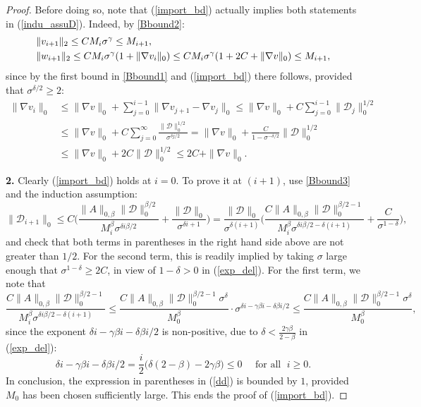 \documentclass[10pt,a4paper]{amsart}
\begin{document}
\begin{proof}
\smallskip

Before doing so, note that (\ref{import_bd}) actually implies both
statements in (\ref{indu_assuD}). Indeed, by \ref{Bbound2}:
\begin{equation*}
\begin{split}
& \|v_{i+1}\|_2\leq CM_i\sigma^\gamma\leq M_{i+1},\vspace{1mm}\\
& \|w_{i+1}\|_2\leq CM_i\sigma^\gamma(1+\|\nabla v_i\|_0) 
\leq CM_i\sigma^\gamma(1+2C +\|\nabla v\|_0) \leq M_{i+1},
\end{split}
\end{equation*}
since by the first bound in \ref{Bbound1} and (\ref{import_bd}) there
follows, provided that $\sigma^{\delta/2}\geq 2$:
\begin{equation}\label{pomoc_v}
\begin{split}
\|\nabla v_i\|_0 & \leq \|\nabla v\|_0 + \sum_{j=0}^{i-1}\|\nabla v_{j+1}-\nabla v_j\|_0
\leq \|\nabla v\|_0 + C\sum_{j=0}^{i-1}\|\mathcal{D}_j\|_0^{1/2} \\ & \leq 
\|\nabla v\|_0 + C\sum_{j=0}^{\infty}\frac{\|\mathcal{D}\|_0^{1/2}}{\sigma^{\delta j/2}} 
= \|\nabla v\|_0 + \frac{C}{1-\sigma^{-\delta/2}} \|\mathcal{D}\|_0^{1/2}
\\ & \leq \|\nabla v\|_0 + {2C} \|\mathcal{D}\|_0^{1/2} \leq 2C +\|\nabla v\|_0.
\end{split}
\end{equation}

\medskip

{\bf 2.} Clearly (\ref{import_bd}) holds at $i=0$. To prove
it at $(i+1)$, use \ref{Bbound3} and the induction assumption:
\begin{equation}\label{dd}
\|\mathcal{D}_{i+1}\|_0\leq C\Big( \frac{\|A\|_{0,\beta}
  \|\mathcal{D}\|_0^{\beta/2}}{M_i^\beta\sigma^{\delta i\beta/2}} +
\frac{\|\mathcal{D}\|_0}{\sigma^{\delta i +1}}\Big) = \frac{\|\mathcal{D}\|_{0}}{\sigma^{\delta(i+1)}}
\Big(\frac{C\|A\|_{0,\beta} \|\mathcal{D}\|_0^{\beta/2-1}}{M_i^\beta\sigma^{\delta i\beta/2 - \delta(i+1)}} +
\frac{C}{\sigma^{1-\delta}}\Big),
\end{equation}
and check that both terms in parentheses in the right hand side above
are not greater than $1/2$. For the second term, this is readily implied by
taking $\sigma$ large enough that $\sigma^{1-\delta}\geq 2C$, in view
of $1-\delta>0$ in (\ref{exp_del}). For the first term, we note that
$$\frac{C\|A\|_{0,\beta} \|\mathcal{D}\|_0^{\beta/2-1}}{M_i^\beta\sigma^{\delta i\beta/2 -  \delta(i+1)}} 
\leq \frac{C\|A\|_{0,\beta} \|\mathcal{D}\|_0^{\beta/2-1}\sigma^\delta}{M_0^\beta}
\cdot \sigma^{\delta i-\gamma\beta i - \delta\beta i/2} \leq \frac{C\|A\|_{0,\beta}
    \|\mathcal{D}\|_0^{\beta/2-1}\sigma^\delta}{M_0^\beta},$$  
since the exponent $\delta i-\gamma\beta i - \delta\beta i/2$ is
non-positive, due to $\delta < \frac{2\gamma\beta}{2-\beta}$ in (\ref{exp_del}):
$$\delta i-\gamma\beta i - \delta\beta i/2 =\frac{i}{2}
\big(\delta(2 - \beta) - 2\gamma\beta \big) \leq 0 \quad\mbox{ for all }\; i\geq 0.$$
In conclusion, the expression in parentheses in (\ref{dd}) is bounded
by $1$, provided $M_0$ has been chosen sufficiently large. This ends the proof of (\ref{import_bd}).


\end{proof}
\end{document}
